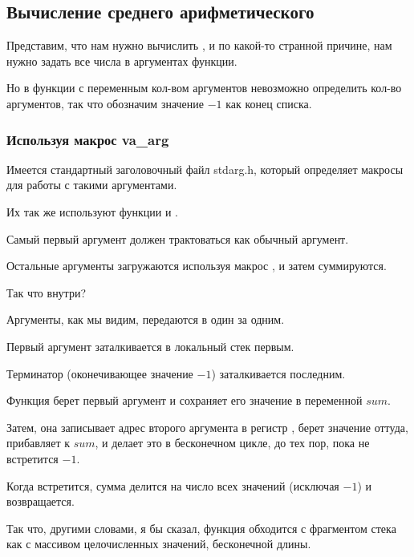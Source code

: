 \subsection{Вычисление среднего арифметического}

Представим, что нам нужно вычислить , 
и по какой-то странной причине, 
нам нужно задать все числа в аргументах функции.

Но в \CCpp функции с переменным кол-вом аргументов невозможно определить кол-во аргументов,
так что обозначим значение $-1$ как конец списка.%

\subsubsection{Используя макрос va\_arg}

Имеется стандартный заголовочный файл stdarg.h, который определяет макросы для работы с такими аргументами.

Их так же используют функции \printf и \scanf.



Самый первый аргумент должен трактоваться как обычный аргумент.

Остальные аргументы загружаются используя макрос , и затем суммируются.

Так что внутри?




Аргументы, как мы видим, передаются в \main один за одним.

Первый аргумент заталкивается в локальный стек первым.

Терминатор (оконечивающее значение $-1$) заталкивается последним.

Функция  берет первый аргумент и сохраняет его значение в переменной $sum$.

Затем, она записывает адрес второго аргумента в регистр \EDX, берет значение оттуда, прибавляет к $sum$,
и делает это в бесконечном цикле, до тех пор, пока не встретится $-1$.

Когда встретится, сумма делится на число всех значений (исключая $-1$) и  
возвращается.

Так что, другими словами, я бы сказал, функция обходится с фрагментом стека как с массивом целочисленных
значений, бесконечной длины.

